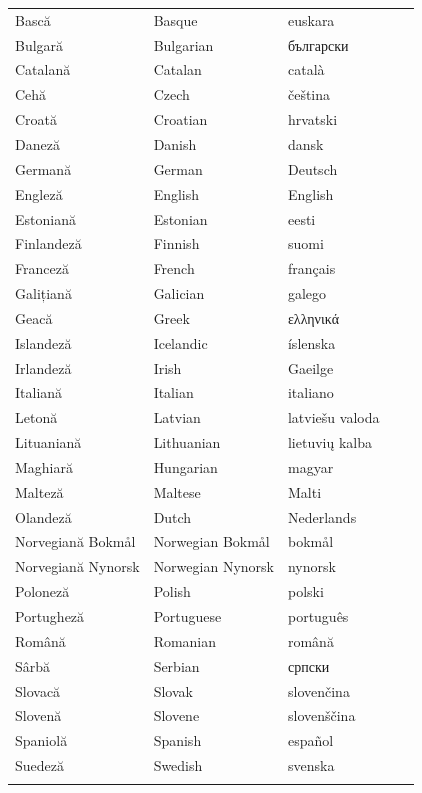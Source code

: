 \documentclass[]{../../metanetpaper}
\begin{document}
\vspace*{-5mm}
\centering
  \setlength{\tabcolsep}{2em}
  \begin{tabularx}{\textwidth}{lllll} \toprule\addlinespace
Bască & Basque & euskara\\
Bulgară & Bulgarian & български\\
Catalană & Catalan & català\\
Cehă & Czech & čeština\\
Croată & Croatian & hrvatski\\
Daneză & Danish & dansk\\
Germană & German & Deutsch\\
Engleză & English & English\\
Estoniană & Estonian & eesti\\
Finlandeză & Finnish & suomi\\
Franceză & French & français\\
Galițiană & Galician & galego\\
Geacă & Greek & ελληνικά\\
Islandeză & Icelandic & íslenska\\
Irlandeză & Irish & Gaeilge\\
Italiană & Italian & italiano\\
Letonă & Latvian & latviešu valoda\\
Lituaniană & Lithuanian & lietuvių kalba\\
Maghiară & Hungarian & magyar\\ 
Malteză & Maltese & Malti\\
Olandeză & Dutch & Nederlands\\
Norvegiană Bokmål & Norwegian Bokmål & bokmål\\
Norvegiană Nynorsk & Norwegian Nynorsk & nynorsk\\
Poloneză & Polish & polski\\
Portugheză & Portuguese & português\\
Română & Romanian & română\\
Sârbă & Serbian & српски\\
Slovacă & Slovak & slovenčina\\
Slovenă & Slovene & slovenščina\\
Spaniolă & Spanish & español\\
Suedeză & Swedish & svenska\\
 \addlinespace \bottomrule
\end{tabularx}
\end{document}
